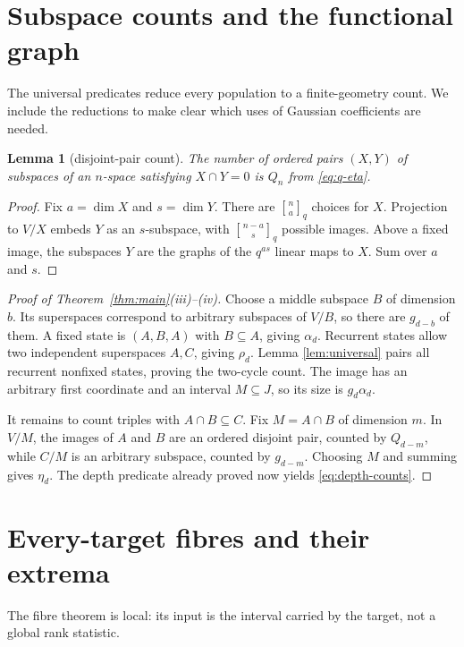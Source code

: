 \documentclass[a4paper,10pt]{amsart}
\newtheorem{lemma}[theorem]{Lemma}
\theoremstyle{remark}
\newcommand{\qbinom}[2]{\genfrac{[}{]}{0pt}{}{#1}{#2}_{q}}
\newcommand{\meet}{\mathbin{\cap}}
\begin{document}
\section{Subspace counts and the functional graph}

The universal predicates reduce every population to a finite-geometry count.
We include the reductions to make clear which uses of Gaussian coefficients
are needed.

\begin{lemma}[disjoint-pair count]\label{lem:disjoint}
The number of ordered pairs $(X,Y)$ of subspaces of an $n$-space satisfying
$X\meet Y=0$ is $Q_n$ from \eqref{eq:q-eta}.
\end{lemma}

\begin{proof}
Fix $a=\dim X$ and $s=\dim Y$.  There are $\qbinom na$ choices for $X$.
Projection to $V/X$ embeds $Y$ as an $s$-subspace, with
$\qbinom{n-a}s$ possible images.  Above a fixed image, the subspaces $Y$ are
the graphs of the $q^{as}$ linear maps to $X$.  Sum over $a$ and $s$.
\end{proof}

\begin{proof}[Proof of Theorem~\ref{thm:main}(iii)--(iv)]
Choose a middle subspace $B$ of dimension $b$.  Its superspaces correspond to
arbitrary subspaces of $V/B$, so there are $g_{d-b}$ of them.  A fixed state
is $(A,B,A)$ with $B\subseteq A$, giving $\alpha_d$.  Recurrent states allow
two independent superspaces $A,C$, giving $\rho_d$.  Lemma
\ref{lem:universal} pairs all recurrent nonfixed states, proving the
two-cycle count.  The image has an arbitrary first coordinate and an interval
$M\subseteq J$, so its size is $g_d\alpha_d$.

It remains to count triples with $A\meet B\subseteq C$.  Fix
$M=A\meet B$ of dimension $m$.  In $V/M$, the images of $A$ and $B$ are an
ordered disjoint pair, counted by $Q_{d-m}$, while $C/M$ is an arbitrary
subspace, counted by $g_{d-m}$.  Choosing $M$ and summing gives $\eta_d$.
The depth predicate already proved now yields \eqref{eq:depth-counts}.
\end{proof}

\section{Every-target fibres and their extrema}

The fibre theorem is local: its input is the interval carried by the target,
not a global rank statistic.
\end{document}
